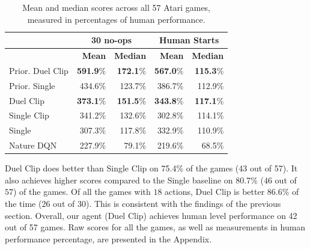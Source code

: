 \begin{table}[t]
\caption{Mean and median scores across all 57 Atari games, measured in percentages of human performance.}
\label{tb:result}
\small
\begin{center}
\begin{tabular}{l|rr|rr}
\multicolumn{1}{c}{\bf }  &\multicolumn{2}{c}{\bf 30 no-ops} &\multicolumn{2}{c}{\bf Human Starts} \\
 \hline
\multicolumn{1}{c}{\bf }  &\multicolumn{1}{r}{\bf Mean} &\multicolumn{1}{r}{\bf Median}&\multicolumn{1}{r}{\bf Mean} &\multicolumn{1}{r}{\bf Median}
\\ \hline 
Prior. Duel Clip  &  {\bf 591.9}\%  & {\bf 172.1}\% &  {\bf 567.0}\%  & {\bf 115.3}\% \\
Prior. Single&  434.6\%  & 123.7\% &  386.7\%  & 112.9\% \\
\hline
Duel Clip       &  {\bf 373.1}\%  & {\bf 151.5}\% &  {\bf 343.8}\%  & {\bf 117.1}\% \\
Single Clip  &  341.2\%  & 132.6\% &  302.8\%  & 114.1\% \\
Single            &  307.3\%   & 117.8\% &  332.9\%   & 110.9\% \\
\hline
Nature DQN            &  227.9\%   & 79.1\% &  219.6\%   & 68.5\% 
\end{tabular}
\end{center}
\end{table}

Duel Clip does better than Single Clip 
on 75.4\% of the games (43 out of 57). It also achieves higher scores compared to the Single baseline on 80.7\% ($46$
out of $57$) of the games. Of all the games with $18$ actions, 
Duel Clip is better $86.6$\% of the time (26 out of 30).
This is consistent with the findings of the previous section.
Overall, our agent (Duel Clip) achieves human level performance on 42 out of 57 games.
Raw scores for all the games, as well as measurements in human performance percentage,
are presented in the Appendix.







